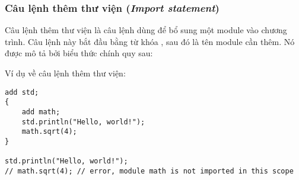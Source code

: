 \subsubsection{\label{ch2:import_stmt}Câu lệnh thêm thư viện (\textit{Import statement})}

Câu lệnh thêm thư viện là câu lệnh dùng để bổ sung một module vào chương trình. Câu lệnh này bắt đầu bằng từ khóa , sau đó là tên module cần thêm. Nó được mô tả bởi biểu thức chính quy sau:

\regeximportstmt

\noindent Ví dụ về câu lệnh thêm thư viện:
\begin{lstlisting}[]
add std;
{
    add math;
    std.println("Hello, world!");
    math.sqrt(4);
}

std.println("Hello, world!");
// math.sqrt(4); // error, module math is not imported in this scope
\end{lstlisting}

